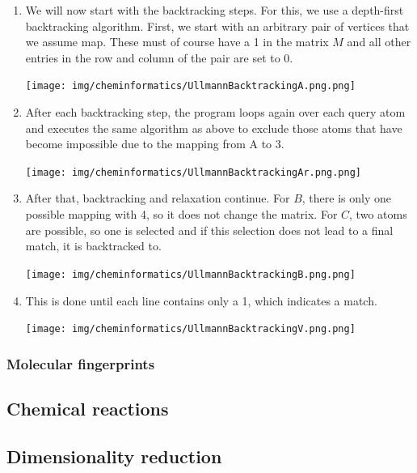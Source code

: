 \begin{enumerate}
    \item We will now start with the backtracking steps. For this, we use a depth-first backtracking algorithm. First, we start with an arbitrary pair of vertices that we assume map. These must of course have a 1 in the matrix $M$ and all other entries in the row and column of the pair are set to 0.
    \begin{center}\texttt{[image: img/cheminformatics/UllmannBacktrackingA.png.png]}\end{center}
    \item After each backtracking step, the program loops again over each query atom and executes the same algorithm as above to exclude those atoms that have become impossible due to the mapping from A to 3.
    \begin{center}\texttt{[image: img/cheminformatics/UllmannBacktrackingAr.png.png]}\end{center}
    \item After that, backtracking and relaxation continue. For $B$, there is only one possible mapping with 4, so it does not change the matrix. For $C$, two atoms are possible, so one is selected and if this selection does not lead to a final match, it is backtracked to.
    \begin{center}\texttt{[image: img/cheminformatics/UllmannBacktrackingB.png.png]}\end{center}
    \item This is done until each line contains only a 1, which indicates a match.
    \begin{center}\texttt{[image: img/cheminformatics/UllmannBacktrackingV.png.png]}\end{center}
\end{enumerate}



%

\subsubsection{Molecular fingerprints}

\subsection{Chemical reactions}

\subsection{Dimensionality reduction}

